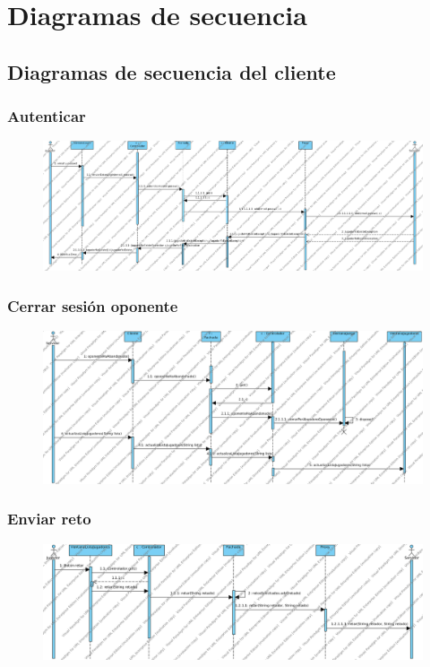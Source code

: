 \section{Diagramas de secuencia}
\subsection{Diagramas de secuencia del cliente}
\subsubsection{Autenticar}
 \begin{figure}[h]
 \centering
 \includegraphics[scale=0.3]{img/ds_autenticar.png}
 \end{figure}
\subsubsection{Cerrar sesión oponente}
 \begin{figure}[h]
 \centering
 \includegraphics[scale=0.4]{img/ds_CerrarSesionOponenteCliente.png}
 \end{figure}
 \clearpage
\subsubsection{Enviar reto}
 \begin{figure}[h]
 \centering
 \includegraphics[scale=0.4]{img/ds_EnviarRetoCliente.png}
 \end{figure}
